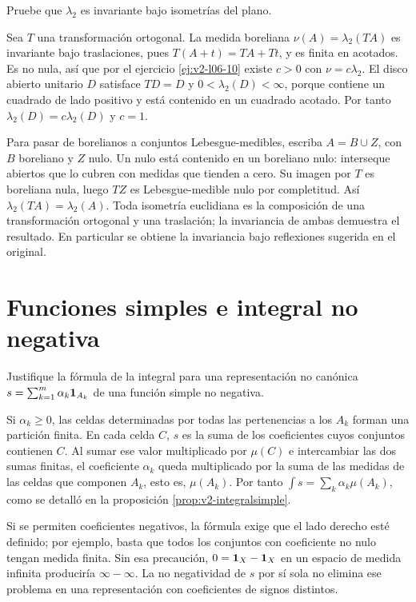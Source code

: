 \begin{ejercicio}\label{ej:v2-l06-11}
Pruebe que $\lambda_2$ es invariante bajo isometrías del plano.
\end{ejercicio}
\begin{solucion}
Sea $T$ una transformación ortogonal. La medida boreliana $\nu(A)=\lambda_2(TA)$ es invariante bajo traslaciones, pues $T(A+t)=TA+Tt$, y es finita en acotados. Es no nula, así que por el ejercicio \ref{ej:v2-l06-10} existe $c>0$ con $\nu=c\lambda_2$. El disco abierto unitario $D$ satisface $TD=D$ y $0<\lambda_2(D)<\infty$, porque contiene un cuadrado de lado positivo y está contenido en un cuadrado acotado. Por tanto $\lambda_2(D)=c\lambda_2(D)$ y $c=1$.

Para pasar de borelianos a conjuntos Lebesgue-medibles, escriba $A=B\cup Z$, con $B$ boreliano y $Z$ nulo. Un nulo está contenido en un boreliano nulo: interseque abiertos que lo cubren con medidas que tienden a cero. Su imagen por $T$ es boreliana nula, luego $TZ$ es Lebesgue-medible nulo por completitud. Así $\lambda_2(TA)=\lambda_2(A)$. Toda isometría euclidiana es la composición de una transformación ortogonal y una traslación; la invariancia de ambas demuestra el resultado. En particular se obtiene la invariancia bajo reflexiones sugerida en el original.
\end{solucion}

\chapter{Funciones simples e integral no negativa}

\begin{ejercicio}\label{ej:v2-l08-1}
Justifique la fórmula de la integral para una representación no canónica $s=\sum_{k=1}^m\alpha_k\mathbf1_{A_k}$ de una función simple no negativa.
\end{ejercicio}
\begin{solucion}
Si $\alpha_k\ge0$, las celdas determinadas por todas las pertenencias a los $A_k$ forman una partición finita. En cada celda $C$, $s$ es la suma de los coeficientes cuyos conjuntos contienen $C$. Al sumar ese valor multiplicado por $\mu(C)$ e intercambiar las dos sumas finitas, el coeficiente $\alpha_k$ queda multiplicado por la suma de las medidas de las celdas que componen $A_k$, esto es, $\mu(A_k)$. Por tanto $\int s=\sum_k\alpha_k\mu(A_k)$, como se detalló en la proposición \ref{prop:v2-integralsimple}.

Si se permiten coeficientes negativos, la fórmula exige que el lado derecho esté definido; por ejemplo, basta que todos los conjuntos con coeficiente no nulo tengan medida finita. Sin esa precaución, $0=\mathbf1_{X}-\mathbf1_{X}$ en un espacio de medida infinita produciría $\infty-\infty$. La no negatividad de $s$ por sí sola no elimina ese problema en una representación con coeficientes de signos distintos.
\end{solucion}

